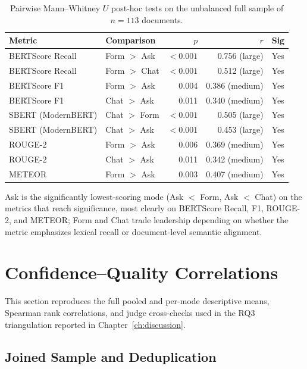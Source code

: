 \begin{table}[H]
\centering
\small
\begin{tabular}{@{}l l r r l@{}}
\toprule
Metric & Comparison & $p$ & $r$ & Sig \\
\midrule
BERTScore Recall & Form $>$ Ask  & $<0.001$ & 0.756 (large)  & Yes \\
BERTScore Recall & Form $>$ Chat & $<0.001$ & 0.512 (large)  & Yes \\
BERTScore F1     & Form $>$ Ask  & 0.004    & 0.386 (medium) & Yes \\
BERTScore F1     & Chat $>$ Ask  & 0.011    & 0.340 (medium) & Yes \\
SBERT (ModernBERT) & Chat $>$ Form & $<0.001$ & 0.505 (large)  & Yes \\
SBERT (ModernBERT) & Chat $>$ Ask  & $<0.001$ & 0.453 (large)  & Yes \\
ROUGE-2          & Form $>$ Ask  & 0.006    & 0.369 (medium) & Yes \\
ROUGE-2          & Chat $>$ Ask  & 0.011    & 0.342 (medium) & Yes \\
METEOR           & Form $>$ Ask  & 0.003    & 0.407 (medium) & Yes \\
\bottomrule
\end{tabular}
\caption{Pairwise Mann--Whitney $U$ post-hoc tests on the
unbalanced full sample of $n = 113$ documents.}
\label{tab:app-nlp-mwu}
\end{table}

Ask is the significantly lowest-scoring mode (Ask $<$ Form, Ask
$<$ Chat) on the metrics that reach significance, most clearly on
BERTScore Recall, F1, ROUGE-2, and METEOR; Form and Chat trade
leadership depending on whether the metric emphasizes lexical
recall or document-level semantic alignment.

\section{Confidence--Quality Correlations}
\label{app:inf-corr}

This section reproduces the full pooled and per-mode descriptive
means, Spearman rank correlations, and judge cross-checks used in
the RQ3 triangulation reported in Chapter~\ref{ch:discussion}.

\subsection{Joined Sample and Deduplication}
\label{app:inf-corr-sample}

